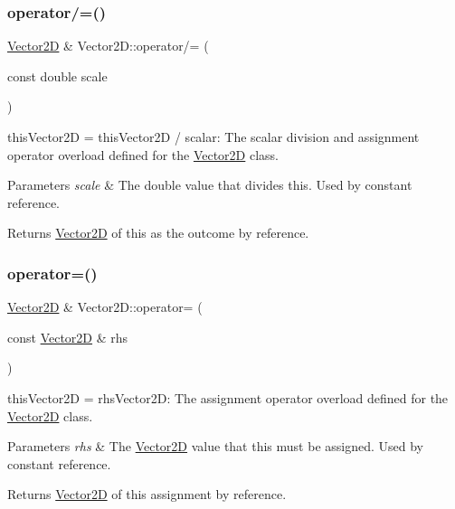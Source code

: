 \subsubsection{\texorpdfstring{operator/=()}{operator/=()}}
{\footnotesize\ttfamily \hyperlink{class_vector2_d}{Vector2D} \& Vector2\+D\+::operator/= (\begin{DoxyParamCaption}\item[{const double}]{scale }\end{DoxyParamCaption})}



this\+Vector2D = this\+Vector2D / scalar\+: The scalar division and assignment operator overload defined for the \hyperlink{class_vector2_d}{Vector2D} class. 


\begin{DoxyParams}{Parameters}
{\em scale} & The double value that divides this. Used by constant reference. \\
\hline
\end{DoxyParams}
\begin{DoxyReturn}{Returns}
\hyperlink{class_vector2_d}{Vector2D} of this as the outcome by reference. 
\end{DoxyReturn}
\mbox{\label{class_vector2_d_abfa56cdcf167527e7c5efd54c4c1bffe}} 
\subsubsection{\texorpdfstring{operator=()}{operator=()}}
{\footnotesize\ttfamily \hyperlink{class_vector2_d}{Vector2D} \& Vector2\+D\+::operator= (\begin{DoxyParamCaption}\item[{const \hyperlink{class_vector2_d}{Vector2D} \&}]{rhs }\end{DoxyParamCaption})}



this\+Vector2D = rhs\+Vector2D\+: The assignment operator overload defined for the \hyperlink{class_vector2_d}{Vector2D} class. 


\begin{DoxyParams}{Parameters}
{\em rhs} & The \hyperlink{class_vector2_d}{Vector2D} value that this must be assigned. Used by constant reference. \\
\hline
\end{DoxyParams}
\begin{DoxyReturn}{Returns}
\hyperlink{class_vector2_d}{Vector2D} of this assignment by reference. 
\end{DoxyReturn}
\mbox{\label{class_vector2_d_a41f425fcd08fb82c7e72e132fb51136f}} 
